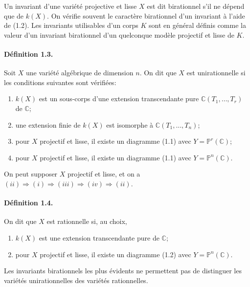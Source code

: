 \documentclass[10pt]{article}
\newcommand{\C}{\mathbb C}
\newcommand{\Pj}{\mathbb P}
\begin{document}
Un invariant d'une variété projective et lisse \(X\) est dit birationnel s'il ne dépend que de \(k(X)\). On vérifie souvent le caractère birationnel d'un invariant à l'aide de (1.2). Les invariants utilisables d'un corps \(K\) sont en général définis comme la valeur d'un invariant birationnel d'un quelconque modèle projectif et lisse de \(K\).

\paragraph{Définition 1.3.} Soit \(X\) une variété algébrique de dimension \(n\). On dit que \(X\) est unirationnelle si les conditions suivantes sont vérifiées:
\begin{enumerate}[label=(\roman*)]
\item \(k(X)\) est un sous-corps d'une extension transcendante pure \(\C(T_1,\ldots,T_r)\) de \(\C\);
\item une extension finie de \(k(X)\) est isomorphe à \(\C(T_1,\ldots,T_n)\);
\item pour \(X\) projectif et lisse, il existe un diagramme (1.1) avec \(Y=\Pj^r(\C)\);
\item pour \(X\) projectif et lisse, il existe un diagramme (1.1) avec \(Y=\Pj^n(\C)\).
\end{enumerate}
On peut supposer \(X\) projectif et lisse, et on a \((ii)\Rightarrow(i)\Rightarrow(iii)\Rightarrow(iv)\Rightarrow(ii)\).

\paragraph{Définition 1.4.} On dit que \(X\) est rationnelle si, au choix,
\begin{enumerate}[label=(\roman*)]
\item \(k(X)\) est une extension transcendante pure de \(\C\);
\item pour \(X\) projectif et lisse, il existe un diagramme (1.2) avec \(Y=\Pj^n(\C)\).
\end{enumerate}

Les invariants birationnels les plus évidents ne permettent pas de distinguer les variétés unirationnelles des variétés rationnelles.
\end{document}
